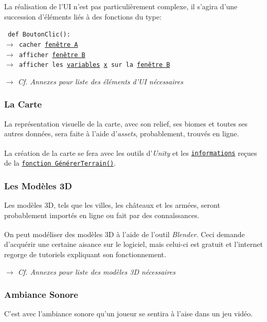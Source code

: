 \documentclass{article}
\newcommand{\ulcolor}[2][class]{\setulcolor{#1}\ul{#2}}
\newcommand{\ulcolor}[2][var]{\setulcolor{#1}\ul{#2}}
\newcommand{\ulcolor}[2][func]{\setulcolor{#1}\ul{#2}}
\newcommand*{\mybox}[2]{\colorbox{#1!30}{\parbox{.98\linewidth}{#2}}}
\newcommand{\genbox}[1]{\mybox{verylightgray}{#1}}
\newcommand{\funcbox}[1]{\mybox{palered}{\texttt{\textcolor{codeColour}{#1}}}}
\newcommand{\vart}[1]{\ulcolor[class]{#1}}
\newcommand{\class}[1]{\texttt{\textcolor{codeColour}{\ulcolor[class]{#1}}}}
\newcommand{\func}[1]{\texttt{\textcolor{codeColour}{\ulcolor[func]{#1}}}}
\newcommand{\var}[1]{\texttt{\textcolor{codeColour}{\ulcolor[var]{#1}}}}
\def\reg{\small{\textsuperscript{\textregistered}}}
\begin{document}
           \genbox{
                La réalisation de l'UI n'est pas particulièrement complexe, il s'agira d'une succession d'éléments liés à des fonctions du type:\\
                \funcbox{
                    def BoutonClic():\\
                    $\rightarrow$ cacher \class{fen\^etre A}\\
                    $\rightarrow$ afficher \class{fen\^etre B}\\
                    $\rightarrow$ afficher les \vart{variables} \var{x} sur la \class{fen\^etre B}
                }
           } 
            
            \textit{$\rightarrow$ Cf. Annexes pour liste des éléments d'UI nécessaires}
            
        \subsubsection{La Carte}
            La représentation visuelle de la carte, avec son relief, ses biomes et toutes ses autres données, sera faite à l'aide d'\emph{assets}, probablement, trouvés en ligne.

            \genbox{
                La création de la carte se fera avec les outils d'\textit{Unity\reg} et les \var{informations} reçues  de la \func{fonction G\'en\'ererTerrain()}.
            }
            
        \subsubsection{Les Modèles 3D}
            Les modèles 3D, tels que les villes, les châteaux et les armées, seront probablement importés en ligne ou fait par des connaîssances.\\

            \genbox{
                On peut modéliser des modèles 3D à l'aide de l'outil \textit{Blender\reg}. Ceci demande d'acquérir une certaine aisance sur le logiciel, mais celui-ci est gratuit et l'internet regorge de tutoriels expliquant son fonctionnement.
            }
            
            \textit{$\rightarrow$ Cf. Annexes pour liste des modèles 3D nécessaires}
            
        \subsubsection{Ambiance Sonore}
            C'est avec l'ambiance sonore qu'un joueur se sentira à l'aise dans un jeu vidéo.
            
\end{document}
